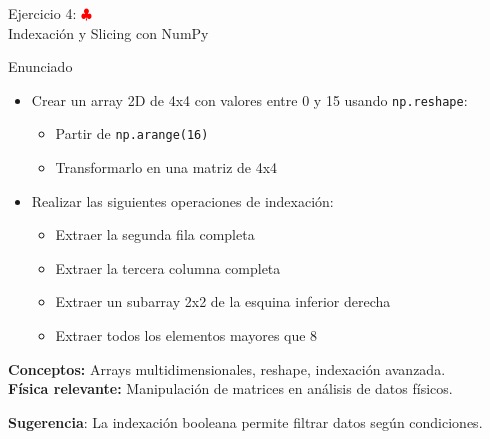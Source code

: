 \documentclass[10pt]{beamer}
\begin{document}
\begin{frame}{Ejercicio 4: \hfill \textcolor{red}{$\clubsuit$} \\ Indexación y Slicing con NumPy}
  \begin{block}{Enunciado}
    \begin{itemize}
      \item Crear un array 2D de 4x4 con valores entre 0 y 15 usando \texttt{np.reshape}:
        \begin{itemize}
          \item Partir de \texttt{np.arange(16)}
          \item Transformarlo en una matriz de 4x4
        \end{itemize}
      \item Realizar las siguientes operaciones de indexación:
        \begin{itemize}
          \item Extraer la segunda fila completa
          \item Extraer la tercera columna completa
          \item Extraer un subarray 2x2 de la esquina inferior derecha
          \item Extraer todos los elementos mayores que 8
        \end{itemize}
    \end{itemize}
  \end{block}
  
  \textbf{Conceptos:} Arrays multidimensionales, reshape, indexación avanzada.\\
  \textbf{Física relevante:} Manipulación de matrices en análisis de datos físicos.
  
  \textbf{Sugerencia}: La indexación booleana permite filtrar datos según condiciones.
\end{frame}
\end{document}
